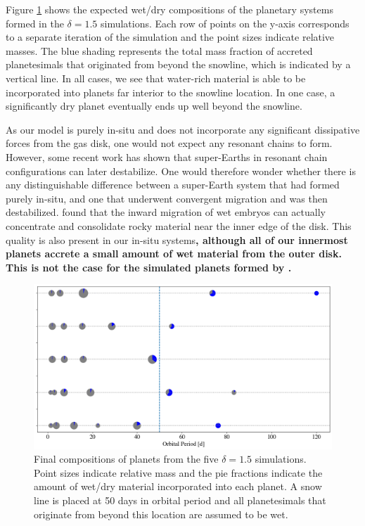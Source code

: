 Figure \ref{fig:snowline} shows the expected wet/dry compositions of the planetary systems formed in the $\delta = 1.5$ simulations. Each row of points on the y-axis corresponds to a separate iteration of the simulation and the point sizes indicate relative masses. The blue shading represents the total mass fraction of accreted planetesimals that originated from beyond the snowline, which is indicated by a vertical line. In all cases, we see that water-rich material is able to be incorporated into planets far interior to the snowline location. In one case, a significantly dry planet eventually ends up well beyond the snowline.

As our model is purely in-situ and does not incorporate any significant dissipative forces from the gas disk, one would not expect any resonant chains to form. However, some recent work \cite{izidoro17, raymond18} has shown that super-Earths in resonant chain configurations can later destabilize. One would therefore wonder whether there is any distinguishable difference between a super-Earth system that had formed purely in-situ, and one that underwent convergent migration and was then destabilized. \cite{raymond18} found that the inward migration of wet embryos can actually concentrate and consolidate rocky material near the inner edge of the disk. This quality is also present in our in-situ systems\textbf{, although all of our innermost planets accrete a small amount of wet material from the outer disk. This is not the case for the simulated planets formed by \cite{raymond18}.}

\begin{figure}
\begin{center}
    \includegraphics[width=\textwidth]{figures/stip/snowline.png}
    \caption{Final compositions of planets from the five $\delta = 1.5$ simulations. Point sizes indicate relative mass and the pie fractions indicate the amount of wet/dry material incorporated into each planet. A snow line is placed at 50 days in orbital period and all planetesimals that originate from beyond this location are assumed to be wet.\label{fig:snowline}}
\end{center}
\end{figure}

